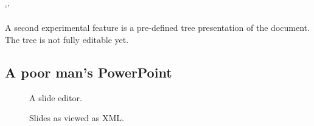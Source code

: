 \begin{center}
 \then
\nopagebreak[4] \\ [2mm]
\begin{small}
\hspace*{-0.15cm}{\em enter} `'
\end{small}
\end{center}



A second experimental feature is a pre-defined tree presentation of the document. The tree is not fully editable yet. 





\subsection{A poor man's PowerPoint}

\begin{figure}
  \begin{minipage}[t]{.40\textwidth}
    \begin{center}   
      \caption{A slide editor.} \label{slideEditorWYSIWYG}
    \end{center}
  \end{minipage}
\hfill
  \begin{minipage}[t]{.56\textwidth}
    \begin{center}  
      \caption{Slides as viewed as XML.} \label{slideEditorSource}
    \end{center}
  \end{minipage}
\end{figure}

